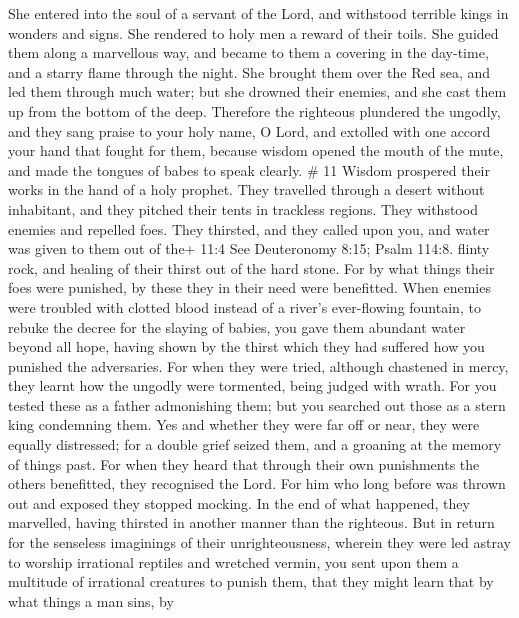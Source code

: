 She entered into the soul of a servant of the Lord, and withstood
terrible kings in wonders and signs.  She rendered to holy
men a reward of their toils. She guided them along a marvellous way, and
became to them a covering in the day-time, and a starry flame through
the night.  She brought them over the Red sea, and led them
through much water;  but she drowned their enemies, and she
cast them up from the bottom of the deep.  Therefore the
righteous plundered the ungodly, and they sang praise to your holy name,
O Lord, and extolled with one accord your hand that fought for them,
 because wisdom opened the mouth of the mute, and made the
tongues of babes to speak clearly. \# 11  Wisdom prospered
their works in the hand of a holy prophet.  They travelled
through a desert without inhabitant, and they pitched their tents in
trackless regions.  They withstood enemies and repelled
foes.  They thirsted, and they called upon you, and water
was given to them out of the+ 11:4 See Deuteronomy 8:15; Psalm 114:8.
flinty rock, and healing of their thirst out of the hard stone.
 For by what things their foes were punished, by these they
in their need were benefitted.  When enemies were troubled
with clotted blood instead of a river's ever-flowing fountain,
 to rebuke the decree for the slaying of babies, you gave
them abundant water beyond all hope,  having shown by the
thirst which they had suffered how you punished the adversaries.
 For when they were tried, although chastened in mercy, they
learnt how the ungodly were tormented, being judged with wrath.
 For you tested these as a father admonishing them; but you
searched out those as a stern king condemning them.  Yes
and whether they were far off or near, they were equally distressed;
 for a double grief seized them, and a groaning at the
memory of things past.  For when they heard that through
their own punishments the others benefitted, they recognised the Lord.
 For him who long before was thrown out and exposed they
stopped mocking. In the end of what happened, they marvelled, having
thirsted in another manner than the righteous.  But in
return for the senseless imaginings of their unrighteousness, wherein
they were led astray to worship irrational reptiles and wretched vermin,
you sent upon them a multitude of irrational creatures to punish them,
 that they might learn that by what things a man sins, by
